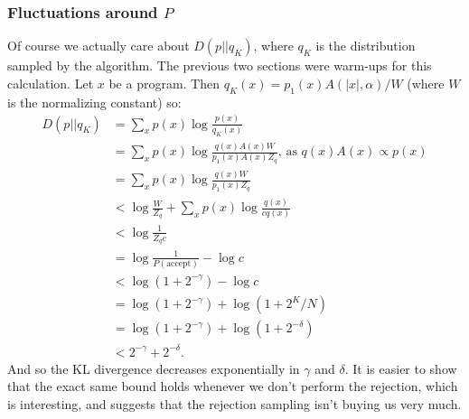 \documentclass{article}
\begin{document}
\subsubsection{Fluctuations around $P$}
Of course we actually care about $D(p||q_K)$, where $q_K$ is the distribution sampled by the algorithm.
The previous two sections were warm-ups for this calculation.
Let $x$ be a program.
Then $q_K(x) = p_1(x)A(|x|,\alpha)/W$ (where $W$ is the normalizing constant)
so:
\begin{align}
  D(p||q_K)& = \sum_x p(x)\log \frac{p(x)}{q_K(x)}\\
  & = \sum_x p(x)\log \frac{q(x)A(x)W}{p_1(x)A(x)Z_q}\text{, as }q(x)A(x)\propto p(x)\\
  & = \sum_x p(x)\log \frac{q(x)W}{p_1(x)Z_q}\\
  &  <  \log \frac{W}{Z_q} +\sum_x p(x) \log \frac{q(x)}{cq(x)}\\
  & < \log \frac{1}{Z_q c}\\
  & = \log \frac{1}{P(\text{accept})} - \log c\\
  & < \log (1 + 2^{ - \gamma}) - \log c\\
  &  =  \log (1 + 2^{ - \gamma}) + \log (1 + 2^K/N)\\
  &  =  \log (1 + 2^{ - \gamma}) + \log (1 + 2^{ - \delta})\\
  & < 2^{ - \gamma} + 2^{ - \delta}.
\end{align}
And so the KL divergence decreases exponentially in $\gamma$ and $\delta$.
It is easier to show that the exact same bound holds whenever we don't perform the rejection,
which is interesting,
and suggests that the rejection sampling isn't buying us very much.
\end{document}
